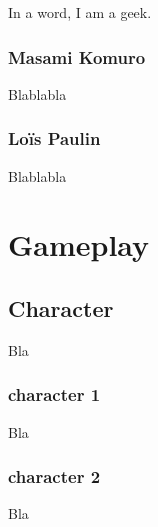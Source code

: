\documentclass[a4paper,12pt]{book}
\begin{document}
In a word, I am a geek.
\section*{Masami Komuro}
Blablabla
\section*{Lo\"{i}s Paulin}
Blablabla
\part{Gameplay}
\chapter{Character}
Bla
\section{character 1}
Bla
\section{character 2}
Bla
\end{document}
